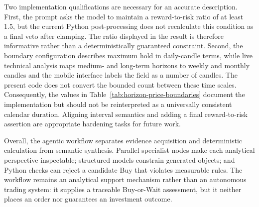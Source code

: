 Two implementation qualifications are necessary for an accurate description. First, the prompt asks the model to maintain a reward-to-risk ratio of at least 1.5, but the current Python post-processing does not recalculate this condition as a final veto after clamping. The ratio displayed in the result is therefore informative rather than a deterministically guaranteed constraint. Second, the boundary configuration describes maximum hold in daily-candle terms, while live technical analysis maps medium- and long-term horizons to weekly and monthly candles and the mobile interface labels the field as a number of candles. The present code does not convert the bounded count between these time scales. Consequently, the values in Table~\ref{tab:horizon-price-boundaries} document the implementation but should not be reinterpreted as a universally consistent calendar duration. Aligning interval semantics and adding a final reward-to-risk assertion are appropriate hardening tasks for future work.

Overall, the agentic workflow separates evidence acquisition and deterministic calculation from semantic synthesis. Parallel specialist nodes make each analytical perspective inspectable; structured models constrain generated objects; and Python checks can reject a candidate Buy that violates measurable rules. The workflow remains an analytical support mechanism rather than an autonomous trading system: it supplies a traceable Buy-or-Wait assessment, but it neither places an order nor guarantees an investment outcome.
